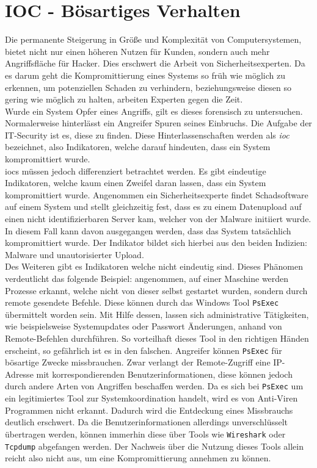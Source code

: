 \documentclass[
    12pt, %
    DIV10,
    ngerman, %
    a4paper, %
    oneside, %
    titlepage, %
    parskip=half, %
    headings=normal, %
    listof=totoc, %
    bibliography=totoc, %
    index=totoc, %
    captions=tableheading, %
    final %
]{scrreprt}
\begin{document}
\chapter{IOC - Bösartiges Verhalten}\label{sec:ioc}
Die permanente Steigerung in Größe und Komplexität von Computersystemen, bietet nicht nur einen höheren Nutzen für Kunden, sondern auch mehr Angriffsfläche für Hacker. Dies erschwert die Arbeit von Sicherheitsexperten. Da es darum geht die Kompromittierung eines Systems so früh wie möglich zu erkennen, um potenziellen Schaden zu verhindern, beziehungsweise diesen so gering wie möglich zu halten, arbeiten Experten gegen die Zeit.\\
Wurde ein System Opfer eines Angriffs, gilt es dieses forensisch zu untersuchen. Normalerweise hinterlässt ein Angreifer Spuren seines Einbruchs. Die Aufgabe der IT-Security ist es, diese zu finden. Diese Hinterlassenschaften werden als \emph{\acf{ioc}} bezeichnet, also Indikatoren, welche darauf hindeuten, dass ein System kompromittiert wurde.\\
%
\ac{iocs} müssen jedoch differenziert betrachtet werden. Es gibt eindeutige Indikatoren, welche kaum einen Zweifel daran lassen, dass ein System kompromittiert wurde. Angenommen ein Sicherheitsexperte findet Schadsoftware auf einem System und stellt gleichzeitig fest, dass es zu einem Datenupload auf einen nicht identifizierbaren Server kam, welcher von der Malware initiiert wurde. In diesem Fall kann davon ausgegangen werden, dass das System tatsächlich kompromittiert wurde. Der Indikator bildet sich hierbei aus den beiden Indizien: Malware und unautorisierter Upload.\\
Des Weiteren gibt es Indikatoren welche nicht eindeutig sind. Dieses Phänomen verdeutlicht das folgende Beispiel: angenommen, auf einer Maschine werden Prozesse erkannt, welche nicht von dieser selbst gestartet wurden, sondern durch remote gesendete Befehle. Diese können durch das Windows Tool \texttt{PsExec} übermittelt worden sein. Mit Hilfe dessen, lassen sich administrative Tätigkeiten, wie beispielsweise Systemupdates oder Passwort Änderungen, anhand von Remote-Befehlen durchführen. So vorteilhaft dieses Tool in den richtigen Händen erscheint, so gefährlich ist es in den falschen. Angreifer können \texttt{PsExec} für bösartige Zwecke missbrauchen. Zwar verlangt der Remote-Zugriff eine IP-Adresse mit korrespondierenden Benutzerinformationen, diese können jedoch durch andere Arten von Angriffen beschaffen werden. Da es sich bei \texttt{PsExec} um ein legitimiertes Tool zur Systemkoordination handelt, wird es von Anti-Viren Programmen nicht erkannt. Dadurch wird die Entdeckung eines Missbrauchs deutlich erschwert. Da die Benutzerinformationen allerdings unverschlüsselt übertragen werden, können immerhin diese über Tools wie \texttt{Wireshark} oder \texttt{Tcpdump} abgefangen werden. Der Nachweis über die Nutzung dieses Tools allein reicht also nicht aus, um eine Kompromittierung annehmen zu können.
\end{document}
